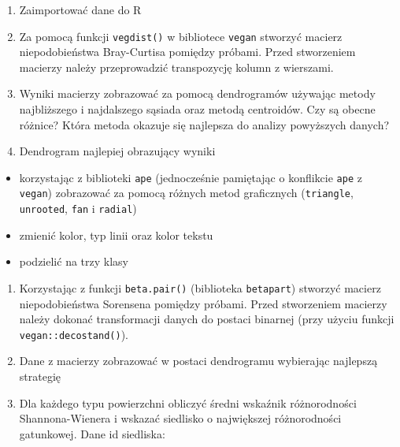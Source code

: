 \documentclass[]{article}
\providecommand{\tightlist}{%
  \setlength{\itemsep}{0pt}\setlength{\parskip}{0pt}}
\begin{document}
\begin{enumerate}
\def\labelenumi{\alph{enumi})}
\tightlist
\item
  Zaimportować dane do R
\item
  Za pomocą funkcji \texttt{vegdist()} w bibliotece \texttt{vegan}
  stworzyć macierz niepodobieństwa Bray-Curtisa pomiędzy próbami. Przed
  stworzeniem macierzy należy przeprowadzić transpozycję kolumn z
  wierszami.
\item
  Wyniki macierzy zobrazować za pomocą dendrogramów używając metody
  najbliższego i najdalszego sąsiada oraz metodą centroidów. Czy są
  obecne różnice? Która metoda okazuje się najlepsza do analizy
  powyższych danych?
\item
  Dendrogram najlepiej obrazujący wyniki
\end{enumerate}

\begin{itemize}
\tightlist
\item
  korzystając z biblioteki \texttt{ape} (jednocześnie pamiętając o
  konflikcie \texttt{ape} z \texttt{vegan}) zobrazować za pomocą różnych
  metod graficznych (\texttt{triangle}, \texttt{unrooted}, \texttt{fan}
  i \texttt{radial})
\item
  zmienić kolor, typ linii oraz kolor tekstu
\item
  podzielić na trzy klasy
\end{itemize}

\begin{enumerate}
\def\labelenumi{\alph{enumi})}
\setcounter{enumi}{4}
\tightlist
\item
  Korzystając z funkcji \texttt{beta.pair()} (biblioteka
  \texttt{betapart}) stworzyć macierz niepodobieństwa Sorensena pomiędzy
  próbami. Przed stworzeniem macierzy należy dokonać transformacji
  danych do postaci binarnej (przy użyciu funkcji
  \texttt{vegan::decostand()}).
\item
  Dane z macierzy zobrazować w postaci dendrogramu wybierając najlepszą
  strategię
\item
  Dla każdego typu powierzchni obliczyć średni wskaźnik różnorodności
  Shannona-Wienera i wskazać siedlisko o największej różnorodności
  gatunkowej. Dane id siedliska:
\end{enumerate}
\end{document}
